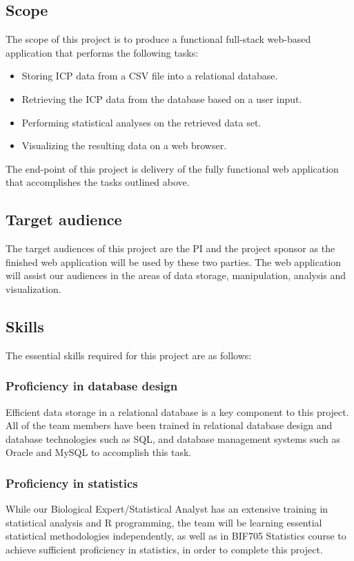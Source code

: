 \documentclass[10pt,twocolumn,letterpaper]{article}
\begin{document}
            \subsection{Scope}
            The scope of this project is to produce a functional full-stack web-based application that performs the following tasks:
            \begin{itemize}
                  \item Storing ICP data from a CSV file into a relational database.
                  \item Retrieving the ICP data from the database based on a user input.
                  \item Performing statistical analyses on the retrieved data set.
                  \item Visualizing the resulting data on a web browser.
            \end{itemize}
            The end-point of this project is delivery of the fully functional web application that accomplishes the tasks outlined above.
            \subsection{Target audience}
            The target audiences of this project are the PI and the project sponsor as the finished web application will be used by these two parties. The web application will assist our audiences in the areas of data storage, manipulation, analysis and visualization.

            \subsection{Skills}

            The essential skills required for this project are as follows:
            \subsubsection{Proficiency in database design}
            Efficient data storage in a relational database is a key component to this project. All of the team members have been trained in relational database design and database technologies such as SQL, and database management systems such as Oracle and MySQL to accomplish this task.
            \subsubsection{Proficiency in statistics}
            While our Biological Expert/Statistical Analyst has an extensive training in statistical analysis and R programming, the team will be learning essential statistical methodologies independently, as well as in BIF705 Statistics course to achieve sufficient proficiency in statistics, in order to complete this project.
\end{document}
